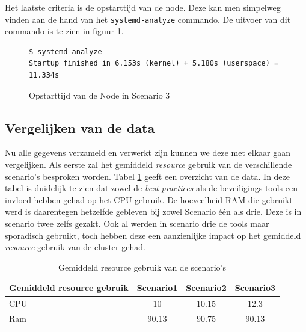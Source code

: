 Het laatste criteria is de opstarttijd van de node. Deze kan men simpelweg vinden aan de hand van het \verb|systemd-analyze| commando. De uitvoer van dit commando is te zien in figuur \ref{SC3_StartTime}.

\begin{figure}[h]
	\centering
	\begin{verbatim} 
$ systemd-analyze
Startup finished in 6.153s (kernel) + 5.180s (userspace) = 11.334s
	\end{verbatim}
	\caption{Opstarttijd van de Node in Scenario 3}
	\label{SC3_StartTime}
\end{figure}

\clearpage
\subsection{Vergelijken van de data}
Nu alle gegevens verzameld en verwerkt zijn kunnen we deze met elkaar gaan vergelijken. Als eerste zal het gemiddeld \textit{resource} gebruik van de verschillende scenario's besproken worden. Tabel \ref{tab:AVGResource} geeft een overzicht van de data. In deze tabel is duidelijk te zien dat zowel de \textit{best practices} als de beveiligings-tools een invloed hebben gehad op het CPU gebruik. De hoeveelheid RAM die gebruikt werd is daarentegen hetzelfde gebleven bij zowel Scenario één als drie. Deze is in scenario twee zelfs gezakt. Ook al werden in scenario drie de tools maar sporadisch gebruikt, toch hebben deze een aanzienlijke impact op het gemiddeld \textit{resource} gebruik van de cluster gehad. 
\begin{table}[h]
	\centering
	\begin{tabular}{lccc}
		Gemiddeld resource gebruik & Scenario1 & Scenario2 & Scenario3 \\ \hline
		CPU                        & 10        & 10.15        & 12.3      \\ \hline
		Ram                        & 90.13     & 90.75        & 90.13    
	\end{tabular}
	\caption{Gemiddeld resource gebruik van de scenario's}
	\label{tab:AVGResource}
\end{table}

